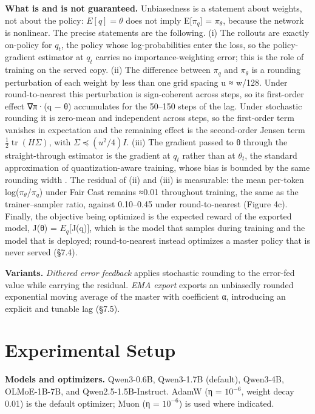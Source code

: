 \documentclass[
  10pt,
]{article}
\begin{document}
\textbf{What is and is not guaranteed.} Unbiasedness is a statement about weights, not about the
policy: \(E[q] = \theta\) does not imply E{[}\(\pi_q\){]} = \(\pi_\theta\), because the network is
nonlinear. The precise statements are the following. (i) The rollouts are exactly on-policy for
\(q_t\), the policy whose log-probabilities enter the loss, so the policy-gradient estimator at
\(q_t\) carries no importance-weighting error; this is the role of training on the served copy. (ii)
The difference between \(\pi_q\) and \(\pi_\theta\) is a rounding perturbation of each weight by
less than one grid spacing u ≈ \textbar w\textbar/128. Under round-to-nearest this perturbation is
sign-coherent across steps, so its first-order effect ∇π·(q − θ) accumulates for the 50--150 steps
of the lag. Under stochastic rounding it is zero-mean and independent across steps, so the
first-order term vanishes in expectation and the remaining effect is the second-order Jensen term
\(\tfrac{1}{2} \operatorname{tr}(H \Sigma )\), with \(\Sigma \preceq (u^{2}/4) I\). (iii) The
gradient passed to θ through the straight-through estimator is the gradient at \(q_t\) rather than
at \(\theta_t\), the standard approximation of quantization-aware training, whose bias is bounded by
the same rounding width \cite{r23,r24}. The residual of (ii) and (iii) is measurable: the mean
per-token \textbar log(\(\pi_\theta\)/\(\pi_q\))\textbar{} under Fair Cast remains ≈0.01 throughout
training, the same as the trainer--sampler ratio, against 0.10--0.45 under round-to-nearest (Figure
4c). Finally, the objective being optimized is the expected reward of the exported model, J(θ) =
\(E_q\){[}J(q){]}, which is the model that samples during training and the model that is deployed;
round-to-nearest instead optimizes a master policy that is never served (§7.4).

\textbf{Variants.} \emph{Dithered error feedback} applies stochastic rounding to the error-fed value
while carrying the residual. \emph{EMA export} exports an unbiasedly rounded exponential moving
average of the master with coefficient α, introducing an explicit and tunable lag (§7.5).

\section{Experimental Setup}\label{experimental-setup}

\textbf{Models and optimizers.} Qwen3-0.6B, Qwen3-1.7B (default), Qwen3-4B, OLMoE-1B-7B, and
Qwen2.5-1.5B-Instruct. AdamW (η = \(10^{-6}\), weight decay 0.01) is the default optimizer; Muon
\cite{r19} (η = \(10^{-6}\)) is used where indicated.
\end{document}
